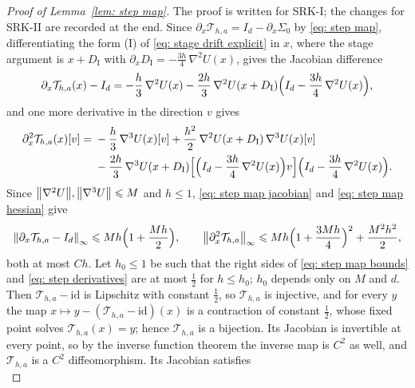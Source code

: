 \documentclass[namedate,webpdf,imanum]{ima-authoring-template}
\newcommand{\Le}{\leqslant}
\theoremstyle{thmstyletwo}
\numberwithin{equation}{section}
\begin{document}
\begin{proof}[Proof of Lemma~\ref{lem: step map}]
    The proof is written for SRK-I; the changes for SRK-II are recorded at the end. Since $\partial_x \mathcal T_{h,a} = I_d - \partial_x \Sigma_0$ by \eqref{eq: step map}, differentiating the form (I) of \eqref{eq: stage drift explicit} in $x$, where the stage argument is $x + D_{\mathrm I}$ with $\partial_x D_{\mathrm I} = - \frac{3h}{4}\, \nabla^2 U(x)$, gives the Jacobian difference
    \begin{equation}
        \partial_x \mathcal T_{h,a}(x) - I_d = - \frac h3\, \nabla^2 U(x) - \frac{2h}{3}\, \nabla^2 U(x + D_{\mathrm I}) \Bigl( I_d - \frac{3h}{4}\, \nabla^2 U(x) \Bigr) ,
        \label{eq: step map jacobian}
    \end{equation}
    and one more derivative in the direction $v$ gives 
    \begin{align}
        \partial_x^2 \mathcal T_{h,a}(x)[v] = {} & - \frac h3\, \nabla^3 U(x)[v] + \frac{h^2}{2}\, \nabla^2 U(x + D_{\mathrm I})\, \nabla^3 U(x)[v] \notag \\
        & - \frac{2h}{3}\, \nabla^3 U(x + D_{\mathrm I}) \Bigl[ \Bigl( I_d - \frac{3h}{4}\, \nabla^2 U(x) \Bigr) v \Bigr] \Bigl( I_d - \frac{3h}{4}\, \nabla^2 U(x) \Bigr) .
        \label{eq: step map hessian}
    \end{align}
    Since $\norm{\nabla^2 U}, \norm{\nabla^3 U} \Le M$ and $h \Le 1$, \eqref{eq: step map jacobian} and \eqref{eq: step map hessian} give
    \begin{equation*}
        \norm{\partial_x \mathcal T_{h,a} - I_d}_\infty \Le M h \Bigl( 1 + \frac{M h}{2} \Bigr) , \qquad
        \norm{\partial_x^2 \mathcal T_{h,a}}_\infty \Le M h \Bigl( 1 + \frac{3 M h}{4} \Bigr)^2 + \frac{M^2 h^2}{2} ,
    \end{equation*}
    both at most $C h$. Let $h_0 \Le 1$ be such that the right sides of \eqref{eq: step map bounds} and \eqref{eq: step derivatives} are at most $\frac12$ for $h \Le h_0$; $h_0$ depends only on $M$ and $d$. Then $\mathcal T_{h,a} - \mathrm{id}$ is Lipschitz with constant $\frac12$, so $\mathcal T_{h,a}$ is injective, and for every $y$ the map $x \mapsto y - ( \mathcal T_{h,a} - \mathrm{id} )(x)$ is a contraction of constant $\frac12$, whose fixed point solves $\mathcal T_{h,a}(x) = y$; hence $\mathcal T_{h,a}$ is a bijection. Its Jacobian is invertible at every point, so by the inverse function theorem the inverse map is $C^2$ as well, and $\mathcal T_{h,a}$ is a $C^2$ diffeomorphism. Its Jacobian satisfies
    \begin{equation*}

\end{equation*}
\end{proof}
\end{document}
